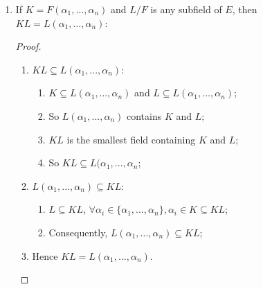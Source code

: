 \documentclass[12pt]{article}
\begin{document}
\begin{enumerate}
\item If $K=F(\alpha_1,\dots,\alpha_n)$ and $L/F$ is any subfield of $E$, then $KL=L(\alpha_1,\dots,\alpha_n)$:
\begin{proof}
    ~
    \begin{enumerate}
\item $KL\subseteq L(\alpha_1,...,\alpha_n)$:
\begin{enumerate}
    \item $K\subseteq L(\alpha_1,\dots,\alpha_n)$ and $L\subseteq L(\alpha_1,\dots,\alpha_n)$;
    \item So $L(\alpha_1,...,\alpha_n)$ contains $K$ and $L$;
    \item $KL$ is the smallest field containing $K$ and $L$;
    \item So $KL\subseteq L(\alpha_1,...,\alpha_n$;
\end{enumerate}
\item $L(\alpha_1,...,\alpha_n)\subseteq KL$:
\begin{enumerate}
    \item $L\subseteq KL$, $\forall \alpha_i\in\{\alpha_1,...,\alpha_n\},\alpha_i\in K\subseteq KL$;
    \item Consequently, $L(\alpha_1,...,\alpha_n)\subseteq KL$;
\end{enumerate}
\item Hence $KL=L(\alpha_1,\dots,\alpha_n)$.
\end{enumerate}
\end{proof}


\end{enumerate}
\end{document}
